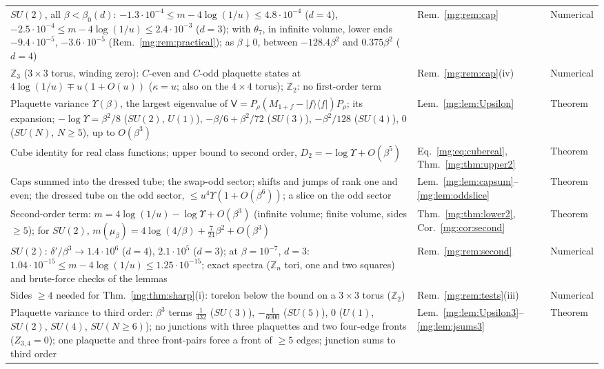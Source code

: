 \documentclass[11pt,a4paper]{article}
\theoremstyle{definition}
\theoremstyle{remark}
\begin{document}
\begin{longtable}{@{}p{}p{}p{}@{}}
$SU(2)$, all $\beta<\beta_0(d)$: $-1.3\cdot10^{-4}\le m-4\log(1/u)\le4.8\cdot10^{-4}$ ($d=4$), $-2.5\cdot10^{-4}\le m-4\log(1/u)\le2.4\cdot10^{-3}$ ($d=3$); with $\theta_7$, in infinite volume, lower ends $-9.4\cdot10^{-5}$, $-3.6\cdot10^{-5}$ (Rem.~\ref{mg:rem:practical}); as $\beta\downarrow0$, between $-128.4\beta^2$ and $0.375\beta^2$ ($d=4$) & Rem.~\ref{mg:rem:cap} & Numerical\\
$\mathbb Z_3$ ($3\times3$ torus, winding zero): $C$-even and $C$-odd plaquette states at $4\log(1/u)\mp u(1+O(u))$ ($\kappa=u$; also on the $4\times4$ torus); $\mathbb Z_2$: no first-order term & Rem.~\ref{mg:rem:cap}(iv) & Numerical\\
Plaquette variance $\Upsilon(\beta)$, the largest eigenvalue of $\mathsf V=P_\rho(M_{1+f}-|f\rangle\langle f|)P_\rho$; its expansion; $-\log\Upsilon=\beta^2/8$ ($SU(2)$, $U(1)$), $-\beta/6+\beta^2/72$ ($SU(3)$), $-\beta^2/128$ ($SU(4)$), $0$ ($SU(N)$, $N\ge5$), up to $O(\beta^3)$ & Lem.~\ref{mg:lem:Upsilon} & Theorem\\
Cube identity for real class functions; upper bound to second order, $D_2=-\log\Upsilon+O(\beta^5)$ & Eq.~\eqref{mg:eq:cubereal}, Thm.~\ref{mg:thm:upper2} & Theorem\\
Caps summed into the dressed tube; the swap-odd sector; shifts and jumps of rank one and even; the dressed tube on the odd sector, $\le u^4\Upsilon(1+O(\beta^6))$; a slice on the odd sector & Lem.~\ref{mg:lem:capsum}--\ref{mg:lem:oddslice} & Theorem\\
Second-order term: $m=4\log(1/u)-\log\Upsilon+O(\beta^3)$ (infinite volume; finite volume, sides $\ge5$); for $SU(2)$, $m(\mu_\beta)=4\log(4/\beta)+\frac7{24}\beta^2+O(\beta^3)$ & Thm.~\ref{mg:thm:lower2}, Cor.~\ref{mg:cor:second} & Theorem\\
$SU(2)$: $\delta'/\beta^3\to1.4\cdot10^6$ ($d=4$), $2.1\cdot10^5$ ($d=3$); at $\beta=10^{-7}$, $d=3$: $1.04\cdot10^{-15}\le m-4\log(1/u)\le1.25\cdot10^{-15}$; exact spectra ($\mathbb Z_n$ tori, one and two squares) and brute-force checks of the lemmas & Rem.~\ref{mg:rem:second} & Numerical\\
Sides $\ge4$ needed for Thm.~\ref{mg:thm:sharp}(i): torelon below the bound on a $3\times3$ torus ($\mathbb Z_2$) & Rem.~\ref{mg:rem:tests}(iii) & Numerical\\
Plaquette variance to third order: $\beta^3$ terms $\frac1{432}$ ($SU(3)$), $-\frac1{6000}$ ($SU(5)$), $0$ ($U(1)$, $SU(2)$, $SU(4)$, $SU(N\ge6)$); no junctions with three plaquettes and two four-edge fronts ($Z_{3,4}=0$); one plaquette and three front-pairs force a front of $\ge5$ edges; junction sums to third order & Lem.~\ref{mg:lem:Upsilon3}--\ref{mg:lem:jsums3} & Theorem\\

\end{longtable}
\end{document}
